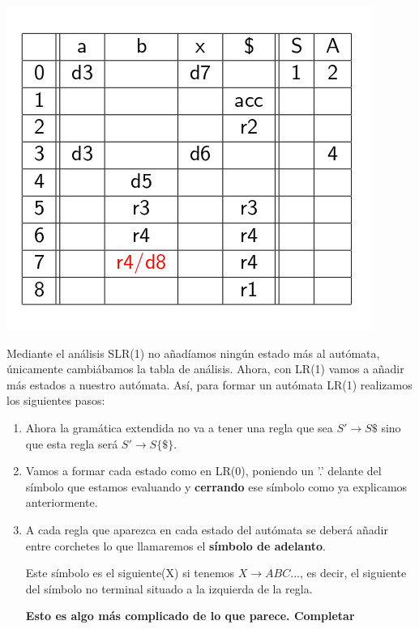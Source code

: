 \documentclass{apuntes}
\begin{document}
\begin{example}
\begin{center}
\includegraphics[scale=0.4]{img/tablaanalisisslr1c1.jpg}
\end{center}
\end{example}

Mediante el análisis SLR(1) no añadíamos ningún estado más al autómata, únicamente cambiábamos la tabla de análisis. Ahora, con LR(1) vamos a añadir más estados a nuestro autómata. Así, para formar un autómata LR(1) realizamos los siguientes pasos:

\begin{enumerate}
\item Ahora la gramática extendida no va a tener una regla que sea $S' \rightarrow S\$$ sino que esta regla será $S' \rightarrow S\{\$\}$.
\item Vamos a formar cada estado como en LR(0), poniendo un '.' delante del símbolo que estamos evaluando y \textbf{cerrando} ese símbolo como ya explicamos anteriormente.
\item A cada regla que aparezca en cada estado del autómata se deberá añadir entre corchetes lo que llamaremos el \textbf{símbolo de adelanto}.

Este símbolo es el siguiente(X) si tenemos $X \rightarrow ABC...$, es decir, el siguiente del símbolo no terminal situado a la izquierda de la regla.

\textbf{Esto es algo más complicado de lo que parece. Completar}

\end{enumerate}
\end{document}
